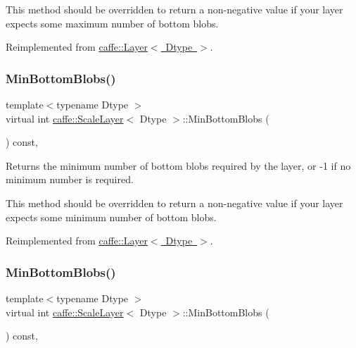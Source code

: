 This method should be overridden to return a non-\/negative value if your layer expects some maximum number of bottom blobs. 

Reimplemented from \mbox{\hyperlink{classcaffe_1_1_layer_af8bdc989053e0363ab032026b46de7c3}{caffe\+::\+Layer$<$ Dtype $>$}}.

\mbox{\label{classcaffe_1_1_scale_layer_a12c10840f0fc3327854864a12054beb2}} 
\subsubsection{\texorpdfstring{Min\+Bottom\+Blobs()}{MinBottomBlobs()}\hspace{0.1cm}{\footnotesize\ttfamily [1/2]}}
{\footnotesize\ttfamily template$<$typename Dtype $>$ \\
virtual int \mbox{\hyperlink{classcaffe_1_1_scale_layer}{caffe\+::\+Scale\+Layer}}$<$ Dtype $>$\+::Min\+Bottom\+Blobs (\begin{DoxyParamCaption}{ }\end{DoxyParamCaption}) const\hspace{0.3cm}{\ttfamily [inline]}, {\ttfamily [virtual]}}



Returns the minimum number of bottom blobs required by the layer, or -\/1 if no minimum number is required. 

This method should be overridden to return a non-\/negative value if your layer expects some minimum number of bottom blobs. 

Reimplemented from \mbox{\hyperlink{classcaffe_1_1_layer_aca3cb2bafaefda5d4760aaebd0b72def}{caffe\+::\+Layer$<$ Dtype $>$}}.

\mbox{\label{classcaffe_1_1_scale_layer_a12c10840f0fc3327854864a12054beb2}} 
\subsubsection{\texorpdfstring{Min\+Bottom\+Blobs()}{MinBottomBlobs()}\hspace{0.1cm}{\footnotesize\ttfamily [2/2]}}
{\footnotesize\ttfamily template$<$typename Dtype $>$ \\
virtual int \mbox{\hyperlink{classcaffe_1_1_scale_layer}{caffe\+::\+Scale\+Layer}}$<$ Dtype $>$\+::Min\+Bottom\+Blobs (\begin{DoxyParamCaption}{ }\end{DoxyParamCaption}) const\hspace{0.3cm}{\ttfamily [inline]}, {\ttfamily [virtual]}}



